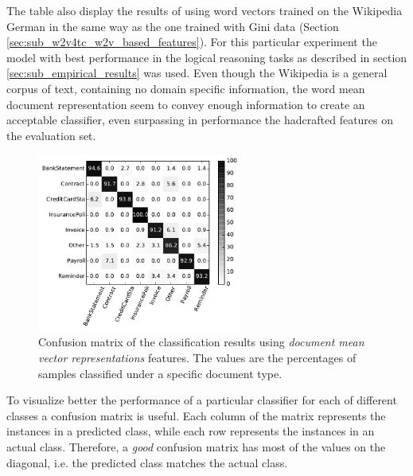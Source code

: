 The table also display the results of using word vectors trained on the
Wikipedia German in the same way as the one trained with Gini data (Section
\ref{sec:sub_w2v4tc_w2v_based_features}). For this particular experiment the
model with best performance in the logical reasoning tasks as described in
section \ref{sec:sub_empirical_results} was used.  Even though  the Wikipedia is a
general corpus of text, containing no domain specific information,
the word mean document representation seem to convey enough information to create an
acceptable classifier, even surpassing in performance the hadcrafted features
on the evaluation set. 
 
 
\begin{figure}[!htbp]
    \centering 
    \includegraphics[width=0.6\textwidth]{images/002-xvalidaton-dmr.pdf}
    \caption{Confusion matrix of the classification results  using
      \textit{document mean vector 
      representations} features. The values are the percentages of samples
    classified under a specific document type.}
    \label{fig:confusion-matrix-dmr}
\end{figure}

To visualize better the performance of a particular classifier for each of different
classes a confusion matrix is useful. Each column of the matrix represents the instances in a predicted class,
while each row represents the instances in an actual class. Therefore, a
\textit{good} confusion matrix has most of the values on the diagonal, i.e. 
the predicted class matches the actual class. 

